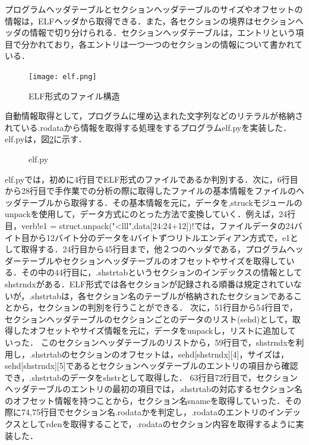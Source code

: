 \documentclass[dvipdfmx]{bta}
\begin{document}
プログラムヘッダテーブルとセクションヘッダテーブルのサイズやオフセットの情報は，ELFヘッダから取得できる．また，各セクションの境界はセクションヘッダの情報で切り分けられる．セクションヘッダテーブルは，エントリという項目で分かれており，各エントリは一つ一つのセクションの情報について書かれている．

\begin{figure}[htbp]
	\centering
 	\texttt{[image: elf.png]}
 	\caption{ELF形式のファイル構造}\label{fig:elf}
\end{figure}

自動情報取得として，プログラムに埋め込まれた文字列などのリテラルが格納されている.rodataから情報を取得する処理をするプログラムelf.pyを実装した．
elf.pyは，図\ref{fig:elf.py}に示す．
\begin{figure}[htbp]

	
	\caption{elf.py}\label{fig:elf.py}
	
\end{figure}

elf.pyでは，初めに4行目でELF形式のファイルであるか判別する．次に，6行目から28行目で手作業での分析の際に取得したファイルの基本情報をファイルのヘッダテーブルから取得する．その基本情報を元に，データを,struckモジュールのunpackを使用して，データ方式にのとった方法で変換していく．例えば，24行目，verb!e1 = struct.unpack("<lll",data[24:24+12])!では，ファイルデータの24バイト目から12バイト分のデータを4バイトずつリトルエンディアン方式で，e1として取得する．24行目から45行目まで，他２つのヘッダである，プログラムヘッダーテーブルやセクションヘッダテーブルのオフセットやサイズを取得している．その中の44行目に，.shstrtabというセクションのインデックスの情報としてshstrndxがある．ELF形式では各セクションが記録される順番は規定されていないが，.shstrtabは，各セクション名のテーブルが格納されたセクションであることから，セクションの判別を行うことができる．
次に，51行目から54行目で，セクションヘッダテーブルのセクションごとのデータのリスト(sehd)として，取得したオフセットやサイズ情報を元に，データをunpackし，リストに追加していった．
このセクションヘッダテーブルのリストから，59行目で，shstrndxを利用し，.shstrtabのセクションのオフセットは，sehd[shstrndx][4]，サイズは，sehd[shstrndx][5]であるとセクションヘッダテーブルのエントリの項目から確認でき，.shstrtabのデータをshstrとして取得した．
63行目72行目で，セクションヘッダテーブルのエントリの最初の項目では，.shstrtabの対応するセクション名のオフセット情報を持つことから，セクション名snameを取得していった．その際に74,75行目でセクション名.rodataかを判定し，.rodataのエントリのインデックスとしてrdenを取得することで，.rodataのセクション内容を取得するように実装した．
\end{document}
